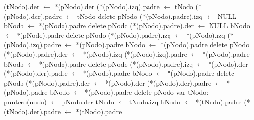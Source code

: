 \begin{Algoritmos}
{				\State *(tNodo).der $\gets$ *(pNodo).der 
				\State *(*(pNodo).izq).padre $\gets$ tNodo 
				\State *(*(pNodo).der).padre $\gets$ tNodo 
				\State delete pNodo 
			\EndIf
		\Else
			 
				 
					\State *(*(pNodo).padre).izq $\gets$ NULL 
					\State bNodo $\gets$ *(pNodo).padre 
					\State delete pNodo 
				\Else
					\State *(*(pNodo).padre).der $\gets$ NULL 
					\State bNodo $\gets$ *(pNodo).padre 
					\State delete pNodo 
				\EndIf
			\EndIf
			 
				 
					\State *(*(pNodo).padre).izq $\gets$ *(pNodo).izq 
					\State *(*(pNodo).izq).padre $\gets$ *(pNodo).padre 
					\State bNodo $\gets$ *(pNodo).padre 
					\State delete pNodo 
				\Else
					\State *(*(pNodo).padre).der $\gets$ *(pNodo).izq 
					\State *(*(pNodo).izq).padre $\gets$ *(pNodo).padre 
					\State bNodo $\gets$ *(pNodo).padre 
					\State delete pNodo 
				\EndIf
			\EndIf
			 
				 
					\State *(*(pNodo).padre).izq $\gets$ *(pNodo).der 
					\State *(*(pNodo).der).padre $\gets$ *(pNodo).padre 
					\State bNodo $\gets$ *(pNodo).padre 
					\State delete pNodo 
				\Else
					\State *(*(pNodo).padre).der $\gets$ *(pNodo).der 
					\State *(*(pNodo).der).padre $\gets$ *(pNodo).padre 
					\State bNodo $\gets$ *(pNodo).padre 
					\State delete pNodo 
				\EndIf
			\EndIf
			 
				\State var tNodo: puntero(nodo) $\gets$ pNodo.der 
				 
					\State tNodo $\gets$ tNodo.izq 
				\EndWhile
				\State bNodo $\gets$ *(tNodo).padre 
				 
					\State *(*(tNodo).der).padre $\gets$ *(tNodo).padre 
}
\end{Algoritmos}
